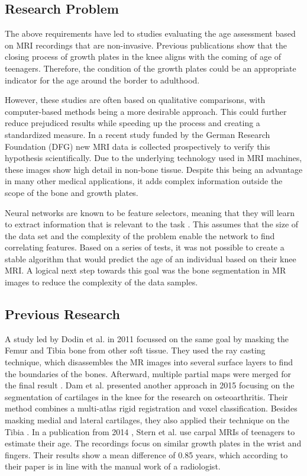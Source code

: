 \subsection{Research Problem}

The above requirements have led to studies evaluating the age assessment based on MRI recordings that are non-invasive. Previous publications \cite{Saring2014}\cite{Jopp2007} show that the closing process of growth plates in the knee aligns with the coming of age of teenagers. Therefore, the condition of the growth plates could be an appropriate indicator for the age around the border to adulthood.

However, these studies are often based on qualitative comparisons, with computer-based methods being a more desirable approach. This could further reduce prejudiced results while speeding up the process and creating a standardized measure. In a recent study funded by the German Research Foundation (DFG) new MRI data is collected prospectively to verify this hypothesis scientifically. Due to the underlying technology used in MRI machines, these images show high detail in non-bone tissue. Despite this being an advantage in many other medical applications, it adds complex information outside the scope of the bone and growth plates.

Neural networks are known to be feature selectors, meaning that they will learn to extract information that is relevant to the task \cite{Setiono1997}. This assumes that the size of the data set and the complexity of the problem enable the network to find correlating features. Based on a series of tests, it was not possible to create a stable algorithm that would predict the age of an individual based on their knee MRI. A logical next step towards this goal was the bone segmentation in MR images to reduce the complexity of the data samples.

\subsection{Previous Research}

A study led by Dodin et al. in 2011 focussed on the same goal by masking the Femur and Tibia bone from other soft tissue. They used the ray casting technique, which disassembles the MR images into several surface layers to find the boundaries of the bones. Afterward, multiple partial maps were merged for the final result \cite{Dodin2011}. Dam et al. presented another approach in 2015 focusing on the segmentation of cartilages in the knee for the research on osteoarthritis. Their method combines a multi-atlas rigid registration and voxel classification. Besides masking medial and lateral cartilages, they also applied their technique on the Tibia \cite{Dam}. In a publication from 2014 \cite{Stern2014}, Stern et al. use carpal MRIs of teenagers to estimate their age. The recordings focus on similar growth plates in the wrist and fingers. Their results show a mean difference of 0.85 years, which according to their paper is in line with the manual work of a radiologist.

